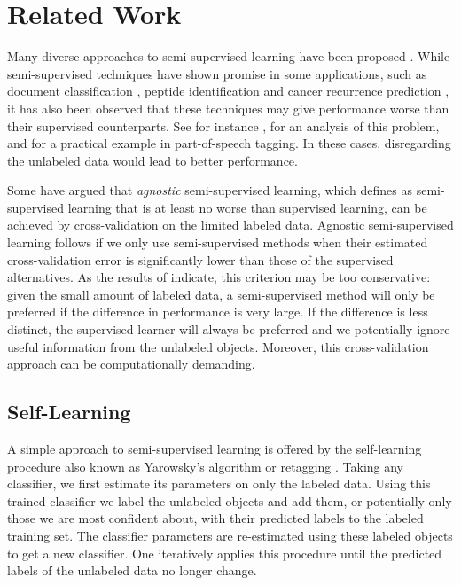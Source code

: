 \documentclass{elsarticle}
\begin{document}
\section{Related Work} 
\label{section:relatedwork}
Many diverse approaches to semi-supervised learning have been proposed   \cite{Chapelle2006,Zhu2009}. While semi-supervised techniques have shown promise in some applications, such as document classification \cite{Nigam2000}, peptide identification \cite{Kall2007} and cancer recurrence prediction \cite{Shi2011}, it has also been observed that these techniques may give performance worse than their supervised counterparts. See for instance \cite{Cozman2006,Cozman2003}, for an analysis of this problem, and \cite{Elworthy1994} for a practical example in part-of-speech tagging.
In these cases, disregarding the unlabeled data would lead to better performance. 

Some \cite{Goldberg2009,Wang2007a} have argued that \emph{agnostic} semi-supervised learning, which \cite{Goldberg2009} defines as semi-supervised learning that is at least no worse than supervised learning, can be achieved by cross-validation on the limited labeled data. 
Agnostic semi-supervised learning follows if we only use semi-supervised methods when their estimated cross-validation error is significantly lower than those of the supervised alternatives.
As the results of  \cite{Goldberg2009} indicate, this criterion may be too conservative: given the small amount of labeled data, a semi-supervised method will only be preferred if the difference in performance is very large. 
If the difference is less distinct, the supervised learner will always be preferred and we potentially ignore useful information from the unlabeled objects. 
Moreover, this cross-validation approach can be computationally demanding. 

\subsection*{Self-Learning}
A simple approach to semi-supervised learning is offered by the self-learning procedure \cite{McLachlan1975} also known as Yarowsky's algorithm \cite{Abney2004,Yarowsky1995} or retagging \cite{Elworthy1994}.
Taking any classifier, we first estimate its parameters on only  the labeled data. 
Using this trained classifier we label the unlabeled objects and add them, or potentially only those we are most confident about, with their predicted labels to the labeled training set. 
The classifier parameters are re-estimated using these labeled objects to get a new classifier. 
One iteratively applies this procedure until the predicted labels of the unlabeled data no longer change.
\end{document}
